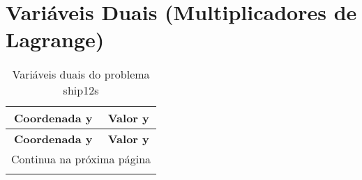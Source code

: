 \documentclass[12pt]{article}
\begin{document}
\section{Variáveis Duais (Multiplicadores de Lagrange)}

\begin{longtable}{@{}cc@{}}
\caption{Variáveis duais do problema ship12s} \\
\toprule
\textbf{Coordenada y} & \textbf{Valor y} \\
\midrule
\endfirsthead

\toprule
\textbf{Coordenada y} & \textbf{Valor y} \\
\midrule
\endhead

\midrule \multicolumn{2}{r}{{Continua na próxima página}} \\ \midrule
\endfoot


\end{longtable}
\end{document}
